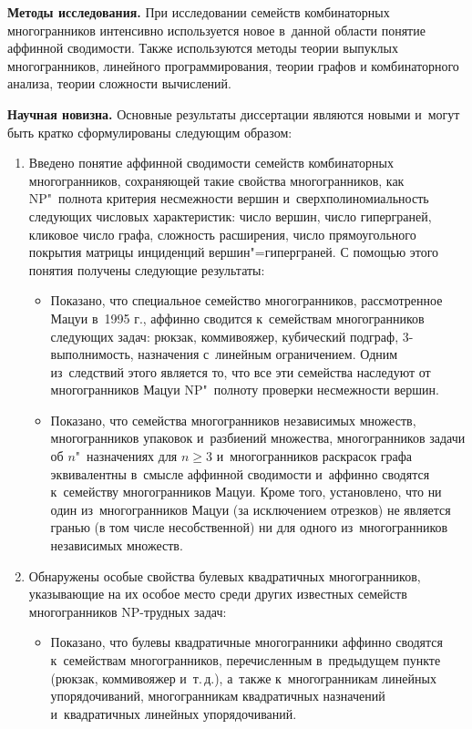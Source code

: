 \textbf{Методы исследования.}
При исследовании семейств комбинаторных многогранников интенсивно используется новое в~данной области понятие аффинной сводимости.
Также используются методы теории выпуклых многогранников, линейного программирования, теории графов и комбинаторного анализа, теории сложности вычислений.


\textbf{Научная новизна.}
Основные результаты диссертации являются новыми и~могут быть кратко сформулированы следующим образом:
\begin{enumerate}
\item Введено понятие аффинной сводимости семейств комбинаторных многогранников, сохраняющей такие свойства многогранников, как NP"~полнота критерия несмежности вершин и~сверхполиномиальность следующих числовых характеристик: число вершин, число гиперграней, кликовое число графа, сложность расширения, число прямоугольного покрытия матрицы инциденций вершин"=гиперграней. С помощью этого понятия получены следующие результаты:
\begin{itemize}
	\item Показано, что специальное семейство многогранников, рассмотренное Мацуи в~1995 г., аффинно сводится к~семействам многогранников следующих задач: рюкзак, коммивояжер, кубический подграф, 3-выполнимость, назначения с~линейным ограничением. %
	Одним из~следствий этого является то, что все эти семейства наследуют от многогранников Мацуи NP"~полноту проверки несмежности вершин.
	\item Показано, что семейства многогранников независимых множеств, многогранников упаковок и~разбиений множества, многогранников задачи об $n$"~назначениях для $n \ge 3$ и~многогранников раскрасок графа эквивалентны в~смысле аффинной сводимости и~аффинно сводятся к~семейству многогранников Мацуи. Кроме того, установлено, что ни один из~многогранников Мацуи (за исключением отрезков) не является гранью (в том числе несобственной) ни для одного из~многогранников независимых множеств.
\end{itemize}
\item Обнаружены особые свойства булевых квадратичных многогранников, указывающие на их особое место среди других известных семейств многогранников NP-трудных задач:
\begin{itemize}
	\item Показано, что булевы квадратичные многогранники аффинно сводятся к~семействам многогранников, перечисленным в~предыдущем пункте (рюкзак, коммивояжер и~т.\,д.), а~также к~многогранникам линейных упорядочиваний, многогранникам квадратичных назначений и~квадратичных линейных упорядочиваний. 

\end{itemize}
\end{enumerate}
